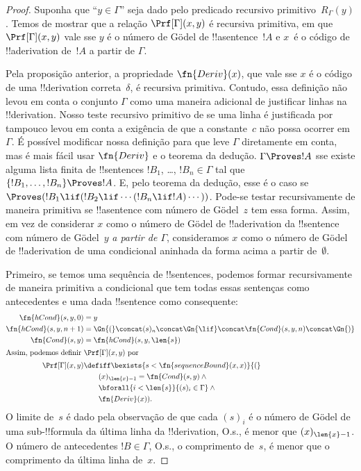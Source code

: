\documentclass[../../../include/open-logic-section]{subfiles}
\begin{document}
\begin{proof}
Suponha que ``$y \in \Gamma$'' seja dado pelo predicado recursivo
primitivo~$R_\Gamma(y)$. Temos de mostrar que a relação
$\Prf[\Gamma](x, y)$ é recursiva primitiva, em que $\Prf[\Gamma](x,
y)$ vale sse $y$ é o número de G\"odel de !!a{sentence}~$!A$ e
$x$~é o código de !!a{derivation} de~$!A$ a partir de $\Gamma$.

Pela proposição anterior, a propriedade $\fn{Deriv}(x)$, que vale sse
$x$ é o código de uma !!{derivation} correta~$\delta$, é recursiva
primitiva. Contudo, essa definição não levou em conta o conjunto
$\Gamma$ como uma maneira adicional de justificar linhas na
!!{derivation}. Nosso teste recursivo primitivo de se uma linha é
justificada por \QR{} tampouco levou em conta a exigência de que a
constante~$c$ não possa ocorrer em~$\Gamma$. É possível modificar
nossa definição para que leve $\Gamma$ diretamente em conta, mas é
mais fácil usar $\fn{Deriv}$ e o teorema da dedução. $\Gamma \Proves
!A$ sse existe alguma lista finita de !!{sentence}s $!B_1$, \dots,
$!B_n \in \Gamma$ tal que $\{!B_1, \dots, !B_n\} \Proves !A$. E, pelo
teorema da dedução, esse é o caso se $\Proves (!B_1 \lif (!B_2 \lif
\cdots (!B_n \lif !A)\cdots))$. Pode-se testar recursivamente de
maneira primitiva se !!a{sentence} com número de G\"odel~$z$ tem essa
forma. Assim, em vez de considerar $x$ como o número de G\"odel de
!!a{derivation} da !!{sentence} com número de G\"odel~$y$ \emph{a
partir de $\Gamma$}, consideramos $x$ como o número de G\"odel de
!!a{derivation} de uma condicional aninhada da forma acima a partir
de~$\emptyset$.

Primeiro, se temos uma sequência de !!{sentence}s, podemos formar
recursivamente de maneira primitiva a condicional que tem todas essas
sentenças como antecedentes e uma dada !!{sentence} como consequente:
\begin{align*}
  \fn{hCond}(s, y, 0) & = y \\
  \fn{hCond}(s, y, n+1) & = \Gn{(} \concat (s)_{n} \concat \Gn{\lif}
  \concat \fn{Cond}(s, y, n) \concat \Gn{)}\\
  \fn{Cond}(s, y) & = \fn{hCond}(s, y, \len{s})\\
  \intertext{Assim, podemos definir $\Prf[\Gamma](x, y)$ por}
  \Prf[\Gamma](x, y) & \defiff \bexists{s < \fn{sequenceBound}(x,x)}{(} \\
  &\qquad (x)_{\len{x}-1} = \fn{Cond}(s,y) \land {} \\
  &\qquad\bforall{i<\len{s}}{(s)_i \in \Gamma} \land {} \\
  &\qquad\fn{Deriv}(x)).
\end{align*}
O limite de~$s$ é dado pela observação de que cada $(s)_i$ é o número
de G\"odel de uma sub-!!{formula} da última linha da !!{derivation},
O.s.\@, é menor que $(x)_{\len{x}-1}$. O número de antecedentes $!B
\in \Gamma$, O.s.\@, o comprimento de~$s$, é menor que o comprimento
da última linha de~$x$.
\end{proof}
\end{document}
